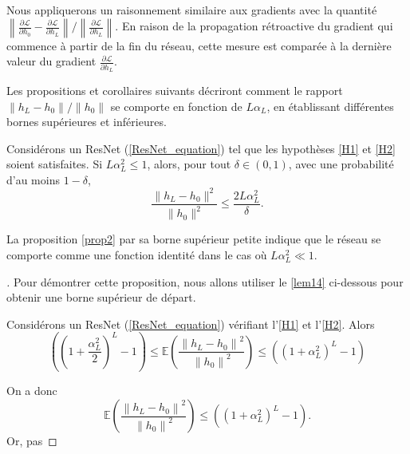 Nous appliquerons un raisonnement similaire aux gradients avec la quantité ${\left\| \frac{\partial \mathcal{L}}{\partial h_0} - \frac{\partial \mathcal{L}}{\partial h_L} \right\|} / {\left\| \frac{\partial \mathcal{L}}{\partial h_L} \right\|}$. En raison de la propagation rétroactive du gradient qui commence à partir de la fin du réseau, cette mesure est comparée à la dernière valeur du gradient $\frac{\partial \mathcal{L}}{\partial h_L}$.

Les propositions et corollaires suivants décriront comment le rapport ${\left\| h_L - h_0 \right\|} / {\left\| h_0 \right\|}$ se comporte en fonction de $L\alpha_L$, en établissant différentes bornes supérieures et inférieures.


\begin{proposition}\label{prop2}
    Considérons un ResNet (\ref{ResNet_equation}) tel que les hypothèses \ref{H1} et \ref{H2} soient satisfaites.
    Si \( L\alpha_L^2 \leq 1 \), alors, pour tout \( \delta \in (0, 1) \), avec une probabilité d'au moins \( 1 - \delta \),
    \[
        \frac{\|h_L - h_0\|^2}{\|h_0\|^2} \leq \frac{2L\alpha_L^2}{\delta}
    .\]
\end{proposition}
La proposition \ref{prop2} par sa borne supérieur petite indique que le réseau se comporte comme une fonction identité dans le cas où $ L \alpha ^2 _L \ll 1 $.

\begin{proof}[]
    Pour démontrer cette proposition, nous allons utiliser le \cref{lem14} ci-dessous pour obtenir une borne supérieur de départ.
    \begin{lem}[Admis]\label{lem14}
        Considérons un ResNet (\ref{ResNet_equation}) vérifiant l'\cref{H1} et l'\cref{H2}. Alors
        \[
            ((1 + \frac{\alpha ^2 _L }{2})^L - 1 ) \leq \mathbb{E}( \frac{\left\| h_L - h_0 \right\| ^2}{\left\| h_0 \right\| ^2}) \leq ((1 + \alpha ^2 _L)^L - 1)
        \]
    \end{lem}
    On a donc 
    \[
        \mathbb{E}( \frac{\left\| h_L - h_0 \right\| ^2}{\left\| h_0 \right\| ^2}) \leq ((1 + \alpha ^2 _L)^L - 1)
    .\]
    Or, pas 

\end{proof}



